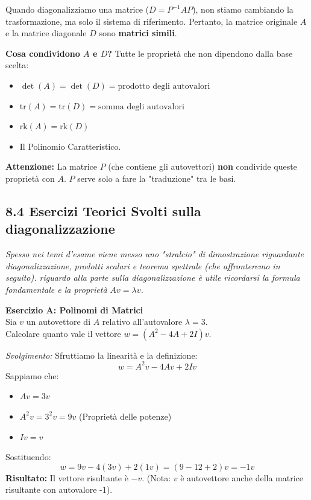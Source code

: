 \documentclass[10pt,a4paper]{article}
\begin{document}
\begin{tcolorbox}[colback=blue!5!white,colframe=blue!60!black,title=\textbf{Rettifica}]
Quando diagonalizziamo una matrice ($D = P^{-1} A P$), non stiamo cambiando la trasformazione, ma solo il sistema di riferimento.
Pertanto, la matrice originale $A$ e la matrice diagonale $D$ sono \textbf{matrici simili}.

\textbf{Cosa condividono $A$ e $D$?}
Tutte le proprietà che non dipendono dalla base scelta:
\begin{itemize}
    \item $\det(A) = \det(D) = \text{prodotto degli autovalori}$
    \item $\text{tr}(A) = \text{tr}(D) = \text{somma degli autovalori}$
    \item $\text{rk}(A) = \text{rk}(D)$
    \item Il Polinomio Caratteristico.
\end{itemize}

\textbf{Attenzione:} La matrice $P$ (che contiene gli autovettori) \textbf{non} condivide queste proprietà con $A$. $P$ serve solo a fare la "traduzione" tra le basi.
\end{tcolorbox}

\subsection*{8.4 Esercizi Teorici Svolti sulla diagonalizzazione}
\textit{Spesso nei temi d'esame viene messo uno "stralcio" di dimostrazione riguardante diagonalizzazione,
prodotti scalari e teorema spettrale (che affronteremo in seguito). riguardo alla parte sulla diagonalizzazione
è utile ricordarsi la formula fondamentale e la proprietà $Av = \lambda v$.}

\vspace{0.3cm}

\textbf{Esercizio A: Polinomi di Matrici}
\\ Sia $v$ un autovettore di $A$ relativo all'autovalore $\lambda = 3$.
\\ Calcolare quanto vale il vettore $w = (A^2 - 4A + 2I)v$.

\textit{Svolgimento:}
Sfruttiamo la linearità e la definizione:
\[ w = A^2 v - 4 A v + 2 I v \]
Sappiamo che:
\begin{itemize}
    \item $A v = 3 v$
    \item $A^2 v = 3^2 v = 9 v$ (Proprietà delle potenze)
    \item $I v = v$
\end{itemize}
Sostituendo:
\[ w = 9v - 4(3v) + 2(1v) = (9 - 12 + 2)v = -1 v \]
\textbf{Risultato:} Il vettore risultante è $-v$. (Nota: $v$ è autovettore anche della matrice risultante con autovalore -1).
\end{document}
